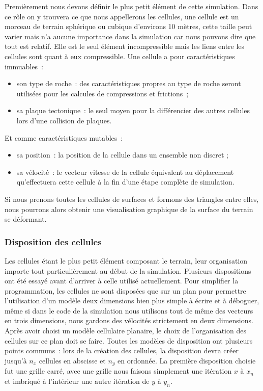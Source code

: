 \documentclass[a4paper,11pt]{article}
\begin{document}
Premièrement nous devons définir le plus petit élément de cette simulation.
Dans ce rôle on y trouvera ce que nous appellerons les cellules, une cellule est un morceau de terrain sphérique ou cubique d'environs 10 mètres, cette taille peut varier mais n'a aucune importance dans la simulation car nous pouvons dire que tout est relatif.
Elle est le seul élément incompressible mais les liens entre les cellules sont quant à eux compressible.
Une cellule a pour caractéristiques immuables~:
\begin{itemize}
  \item son type de roche~: des caractéristiques propres au type de roche seront utilisées pour les calcules de compressions et frictions~;
  \item sa plaque tectonique~: le seul moyen pour la différencier des autres cellules lors d'une collision de plaques.
\end{itemize}
Et comme caractéristiques mutables~:
\begin{itemize}
  \item sa position~: la position de la cellule dans un ensemble non discret ;
  \item sa vélocité~: le vecteur vitesse de la cellule équivalent au déplacement qu'effectuera cette cellule à la fin d'une étape complète de simulation.
\end{itemize}

Si nous prenons toutes les cellules de surfaces et formons des triangles entre elles, nous pourrons alors obtenir une visualisation graphique de la surface du terrain se déformant.

\subsubsection{Disposition des cellules}

Les cellules étant le plus petit élément composant le terrain, leur organisation importe tout particulièrement au début de la simulation.
Plusieurs dispositions ont été essayé avant d'arriver à celle utilisé actuellement.
Pour simplifier la programmation, les cellules ne sont disposées que sur un plan pour permettre l'utilisation d'un modèle deux dimensions bien plus simple à écrire et à déboguer, même si dans le code de la simulation nous utilisons tout de même des vecteurs en trois dimensions, nous gardons des vélocités strictement en deux dimensions. \\
Après avoir choisi un modèle cellulaire planaire, le choix de l'organisation des cellules sur ce plan doit se faire.
Toutes les modèles de disposition ont plusieurs points communs~: lors de la création des cellules, la disposition devra créer jusqu'à $n_x$ cellules en abscisse et $n_y$ en ordonnée.
La première disposition choisie fut une grille carré, avec une grille nous faisons simplement une itération $x$ à $x_n$ et imbriqué à l'intérieur une autre itération de $y$ à $y_n$.
\end{document}
